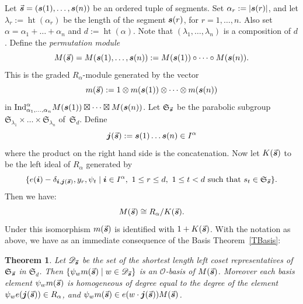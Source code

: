 \documentclass[twoside,11pt,reqno]{amsart}
\numberwithin{equation}{section}
\newtheorem{Theorem}[equation]{Theorem}
\theoremstyle{definition}  %
\def\bi{\text{\boldmath$i$}}
\def\bj{\text{\boldmath$j$}}
\def\bs{\text{\boldmath$s$}}
\newcommand{\0}{{\bar 0}}
\newcommand{\1}{{\bar 1}}
\newcommand{\la}{\lambda}
\newcommand{\al}{\alpha}
\def\Si{\mathfrak{S}}
\newcommand{\Ind}{{\mathrm {Ind}}}
\def\height{{\operatorname{ht}}}
\renewcommand\O{\mathcal O}
\begin{document}
Let $\vec{\bs}=(\bs(1),\dots,\bs(n))$ be an ordered tuple of segments. Set $\al_r:=|\bs(r)|$, and let $\la_r:=\height(\al_r)$ be the length of the segment $\bs(r)$, for $r=1,\dots,n$. Also set $\al=\al_1+\dots+\al_n$ and $d:=\height(\al)$. Note that $(\la_1,\dots,\la_n)$ is a composition of $d$. Define the {\em permutation module} 
$$
M(\vec{\bs})=M(\bs(1),\dots,\bs(n)):=M(\bs(1))\circ\dots\circ M(\bs(n)).
$$
This is the graded $R_{\al}$-module generated by the vector
\begin{equation}\label{EZ}
m(\vec{\bs}):=1\otimes m(\bs(1))\otimes\dots\otimes m(\bs(n)) 
\end{equation}
in $\Ind^{\al}_{\al_1,\dots,\al_n}M(\bs(1))\boxtimes\dots\boxtimes M(\bs(n))$. 
Let $\Si_{\vec{\bs}}$ be the parabolic subgroup $\Si_{\la_1}\times\dots\times\Si_{\la_n}$ of~$\Si_d$.  
Define 
\begin{equation}\label{EBJ}
\bj(\vec{\bs}):=\bs(1)\dots\bs(n)\in I^\al
\end{equation}
where the product on the right hand side is the concatenation. Now let 
$K(\vec{\bs})$ to be the left ideal of $R_\alpha$ generated by
$$\{e(\bi)-\delta_{\bi,\bj(\vec{\bs})}, y_r, \psi_t \mid \bi\in I^\alpha,\ 1\le r\le d,\ 1\leq t<d 
      \text{ such that $s_t\in\Si_{\vec{\bs}}$}\}.
$$
Then we have:
\begin{equation}\label{E:M(s)}
M(\vec{\bs})\cong R_\al/K(\vec{\bs}).
\end{equation}
Under this isomorphism $m(\vec{\bs})$ is identified with $1+K(\vec{\bs})$. With the notation as above, we have as an immediate consequence of the Basis Theorem~\ref{TBasis}: 


\begin{Theorem} \label{TMBasis}%
Let ${\mathscr D}_{\vec{\bs}}$ be the set of the shortest length left coset representatives of $\Si_{\vec{\bs}}$ in $\Si_d$. Then 
$
\{\psi_{w}m(\vec{\bs})\mid w\in {\mathscr D}_{\vec{\bs}}\}
$ 
is an $\O$-basis of $M(\vec{\bs})$. Moreover each basis element $\psi_{w}m(\vec{\bs})$ is homogeneous of degree equal to the degree of the element $\psi_w e(\bj(\vec{\bs}))\in R_\al$, and $\psi_{w}m(\vec{\bs})\in e(w\cdot\bj(\vec{\bs}))M(\vec{\bs})$.
\end{Theorem}
\end{document}
